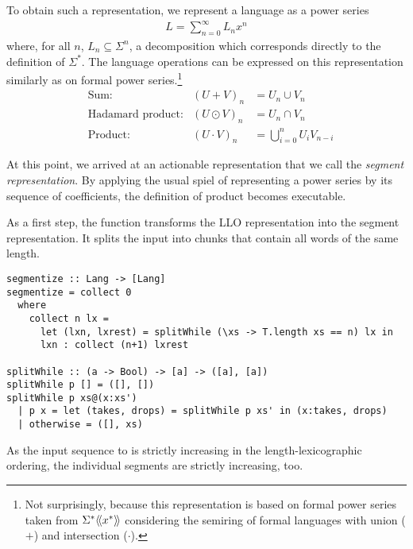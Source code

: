 To obtain such a representation, we represent a language as a power series
\begin{gather*}
  L = \sum_{n=0}^\infty L_nx^n
\end{gather*}
where, for all $n$, $L_n \subseteq \Sigma^n$, a decomposition which corresponds
directly to the definition of $\Sigma^*$. The language operations can
be expressed on this representation similarly as on formal power
series.\footnote{Not surprisingly, because this representation is
  based on formal power series taken from $\FPS[x]{\Sigma^*}$
  considering the semiring of formal languages with union ($+$)
  and intersection ($\cdot$).}
\begin{align}
  &\text{Sum:}
  & (U + V)_n &= U_n \cup V_n \\
  &\text{Hadamard product:}
  & (U \odot V)_n &= U_n \cap V_n \\
  \label{eq:1}
  &\text{Product:}
  & (U \cdot V)_n &= \bigcup_{i=0}^n U_i V_{n-i}
\end{align}

At this point, we arrived at an actionable representation that we call
the \emph{segment representation}. By applying
the usual spiel of representing a power series by its sequence of
coefficients, the definition of product becomes executable.

As a first step, the function  transforms the LLO
representation into the segment representation. It splits the input
into chunks that contain all words of the same length.
\begin{lstlisting}
segmentize :: Lang -> [Lang]
segmentize = collect 0
  where
    collect n lx =
      let (lxn, lxrest) = splitWhile (\xs -> T.length xs == n) lx in 
      lxn : collect (n+1) lxrest

splitWhile :: (a -> Bool) -> [a] -> ([a], [a])
splitWhile p [] = ([], [])
splitWhile p xs@(x:xs')
  | p x = let (takes, drops) = splitWhile p xs' in (x:takes, drops)
  | otherwise = ([], xs)
\end{lstlisting}
As the input sequence to  is strictly increasing in the
length-lexicographic ordering, the individual segments are strictly
increasing, too.

